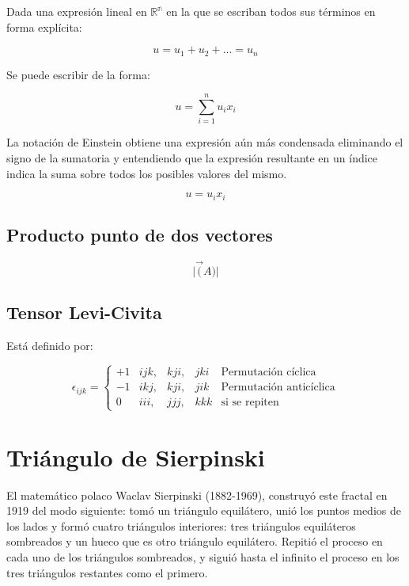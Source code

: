 \documentclass{article}
\providecommand{\abs}[1]{\lvert#1\rvert}
\begin{document}
Dada una expresión lineal en 
$\mathbb{R^n}$ en la que se escriban todos sus términos en forma explícita:

\begin{equation}
    u = u_1 + u_2 + ... = u_n
\end{equation}

Se puede escribir de la forma:

\begin{equation}
    u = \sum_{i=1}^{n} u_ix_i
\end{equation}

La notación de Einstein obtiene una expresión aún más condensada eliminando el
signo de la sumatoria y entendiendo que la expresión resultante en un índice
indica la suma sobre todos los posibles valores del mismo.

\begin{equation}
    u = u_ix_i
\end{equation}

\subsection{Producto punto de dos vectores}
\begin{equation}
    \abs{\vec(A)}
\end{equation}


\subsection{Tensor Levi-Civita}
Está definido por:

\begin{equation}
    \epsilon_{ijk}=
    \left\lbrace\begin{array}{llllr} 
        +1 & ijk, & kji, & jki & \text{Permutación cíclica}\\ 
        -1 & ikj, & kji, & jik & \text{Permutación anticíclica}\\
        0  & iii, & jjj, & kkk & \text{si se repiten}
    \end{array}\right.
\end{equation}



\section{Tri\'angulo de Sierpinski}

El matem\'atico polaco Waclav Sierpinski (1882-1969), construy\'o este fractal en
1919 del modo siguiente: tom\'o un tri\'angulo equil\'atero, uni\'o los puntos medios de
los lados y form\'o cuatro tri\'angulos interiores: tres tri\'angulos equil\'ateros
sombreados y un hueco que es otro tri\'angulo equil\'atero. Repiti\'o el proceso en
cada uno de los tri\'angulos sombreados, y sigui\'o hasta el infinito el proceso en
los tres tri\'angulos restantes como el primero.
\end{document}
